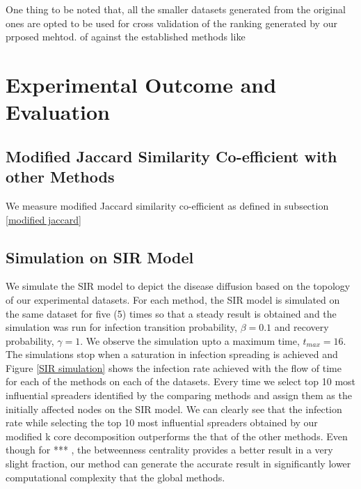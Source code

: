 \documentclass[sigconf]{acmart}
\begin{document}
One thing to be noted that, all the smaller datasets generated from the original ones are opted to be used for cross validation of the ranking generated by our prposed mehtod. of against the established methods like 




\section{Experimental Outcome and Evaluation}
\subsection{Modified Jaccard Similarity Co-efficient with other Methods}
We measure modified Jaccard similarity co-efficient as defined in subsection \ref{modified jaccard} 

\subsection{Simulation on SIR Model}
We simulate the SIR model to depict the disease diffusion based on the topology of our experimental datasets. For each method, the SIR model is simulated on the same dataset for five (5) times so that a steady result is obtained and the simulation was run for infection transition probability, $\beta = 0.1$ and recovery probability, $\gamma = 1$. We observe the simulation upto a maximum time, $t_{max} = 16$. The simulations stop when a saturation in infection spreading is achieved and Figure \ref{SIR simulation} shows the infection rate achieved with the flow of time for each of the methods on each of the datasets. Every time we select top 10 most influential spreaders identified by the comparing methods and assign them as the initially affected nodes on the SIR model. We can clearly see that the infection rate while selecting the top 10 most influential spreaders obtained by our modified k core decomposition outperforms the that of the other methods. Even though for *** , the betweenness centrality provides a better result in a very slight fraction, our method can generate  the accurate result in significantly lower computational complexity that the global methods.    
\end{document}
